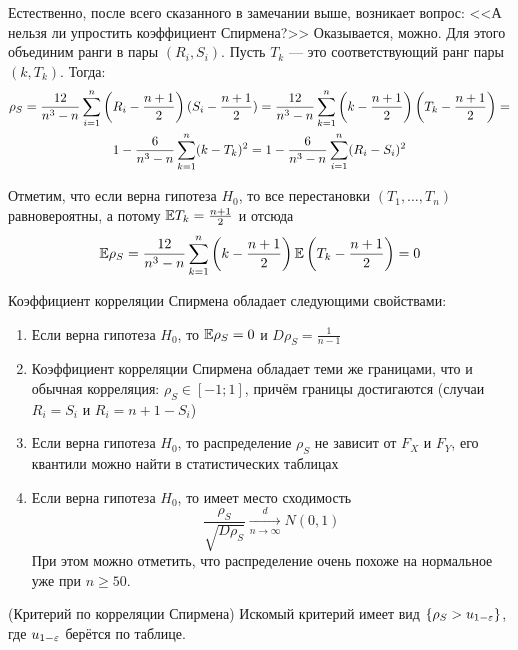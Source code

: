 \begin{note}
	Естественно, после всего сказанного в замечании выше, возникает вопрос: <<А нельзя ли упростить коэффициент Спирмена?>> Оказывается, можно. Для этого объединим ранги в пары $(R_i, S_i)$. Пусть $T_k$ --- это соответствующий ранг пары $(k, T_k)$. Тогда:
	\begin{multline*}
		\rho_S = \frac{12}{n^3 - n} \sum_{i = 1}^n \left(R_i - \frac{n + 1}{2}\right)(S_i - \frac{n + 1}{2}) = \frac{12}{n^3 - n} \sum_{k = 1}^n \left(k - \frac{n + 1}{2}\right)\left(T_k - \frac{n + 1}{2}\right) =
		\\
		1 - \frac{6}{n^3 - n} \sum_{k = 1}^n (k - T_k)^2 = 1 - \frac{6}{n^3 - n}\sum_{i = 1}^n (R_i - S_i)^2
	\end{multline*}
	
	Отметим, что если верна гипотеза $H_0$, то все перестановки $(T_1, \ldots, T_n)$ равновероятны, а потому $\mathbb{E} T_k = \frac{n + 1}{2}$ и отсюда
	\[
		\mathbb{E} \rho_S = \frac{12}{n^3 - n} \sum_{k = 1}^n \left(k - \frac{n + 1}{2}\right)\mathbb{E} \left(T_k - \frac{n + 1}{2}\right) = 0
	\]
\end{note}

\begin{proposition}
	Коэффициент корреляции Спирмена обладает следующими свойствами:
	\begin{enumerate}
		\item Если верна гипотеза $H_0$, то $\mathbb{E} \rho_S = 0$ и $D \rho_S = \frac{1}{n - 1}$
		
		\item Коэффициент корреляции Спирмена обладает теми же границами, что и обычная корреляция: $\rho_S \in [-1; 1]$, причём границы достигаются (случаи $R_i = S_i$ и $R_i = n + 1 - S_i$)
		
		\item Если верна гипотеза $H_0$, то распределение $\rho_S$ не зависит от $F_X$ и $F_Y$, его квантили можно найти в статистических таблицах
		
		\item Если верна гипотеза $H_0$, то имеет место сходимость
		\[
			\frac{\rho_S}{\sqrt{D\rho_S}} \xrightarrow[n \to \infty]{d} N(0, 1)
		\]
		При этом можно отметить, что распределение очень похоже на нормальное уже при $n \ge 50$.
	\end{enumerate}
\end{proposition}

\begin{solution} (Критерий по корреляции Спирмена)
	Искомый критерий имеет вид $\{\rho_S > u_{1 - \varepsilon}\}$, где $u_{1 - \varepsilon}$ берётся по таблице.
\end{solution}


